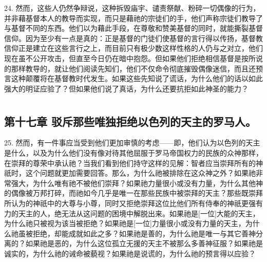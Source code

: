 24. 然而，这些人仍然争辩说，这种拆毁庙宇、谴责祭献、粉碎一切偶像的行为，并非藉基督本人的教导而实现，而只是藉祂的宗徒们的手，他们声称宗徒们教导了与基督不同的东西。他们以为藉此手段，在尊敬和赞美基督的同时，就能撕裂基督信仰。因为至少有一点是真的：正是基督的门徒们使基督的言行得以传扬，基督教信仰正是建立在这些言行之上，而目前只有极少数这样性格的人仍与之对立，他们现在虽不公开攻击，但直至今日仍在暗中抱怨。但如果他们拒绝相信基督是按所说的那样教导的，就让他们阅读先知们，他们不仅命令彻底摧毁偶像迷信，而且还预言这种颠覆将在基督教时代发生。如果这些先知说了谎话，为什么他们的话以如此强大的明证应验了？但如果他们说了真话，为什么还要抗拒如此神圣的能力？\par



\section{}


\subsection{第十七章 驳斥那些唯独拒绝以色列的天主的罗马人。}

25. 然而，有一件事应当受到他们更加审慎的考虑——即，他们认为以色列的天主是什么，以及为什么他们没有像对待其他屈服于罗马帝国权力的民族的众神那样，在崇拜的尊荣中承认祂？当我们看到他们持守这样的见解：智者应当崇拜所有的神祇时，这个问题就更加需要回答。那么，为什么祂被排除在这众神之外？如果祂非常强大，为什么唯有祂不被他们崇拜？如果祂力量很小或没有力量，为什么其他神的偶像被万邦打碎，而祂如今几乎是唯一在那些民族中被崇拜的天主？那些既崇拜所认为的神祇中的大尊与小尊，同时又拒绝崇拜这位比他们所有侍奉的神祇更强有力的天主的人，绝无法从这问题的困境中解脱出来。如果祂是[一位]大能的天主，为什么祂只被视为该当被拒绝？如果祂是[一位]力量很小或没有力量的天主，为什么祂虽被拒绝，却能成就如此之多？如果祂是善的，为什么祂是唯一与其它善神分离的？如果祂是恶的，为什么这位孤立无援的天主不被那么多善神征服？如果祂是诚实的，为什么祂的诫命被藐视？如果祂是说谎的，为什么祂的预言得以应验？\par

